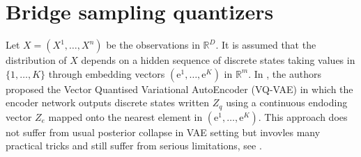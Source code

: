 \documentclass{article}
\newcommand{\rset}{\ensuremath{\mathbb{R}}}
\newcommand{\rme}{\mathrm{e}}
\begin{document}
\section{Bridge sampling quantizers}
 Let $X = (X^1,\ldots,X^n)$ be the observations in $\rset^D$.  It is assumed that the distribution of $X$ depends on a hidden sequence of discrete states taking values in $\{1,\ldots,K\}$ through  embedding vectors $(\rme^1,\ldots,\rme^K)$ in $\rset^m$. In  \cite{oord2017neural}, the authors proposed the Vector Quantised Variational AutoEncoder (VQ-VAE) in which  the encoder network outputs discrete states written $Z_q$ using a continuous endoding vector $Z_e$ mapped onto the nearest element in $(\rme^1,\ldots,\rme^K)$. This approach  does not suffer from usual posterior collapse in VAE setting but invovles many practical tricks and still suffer from serious limitations, see \cite{}.
\end{document}
